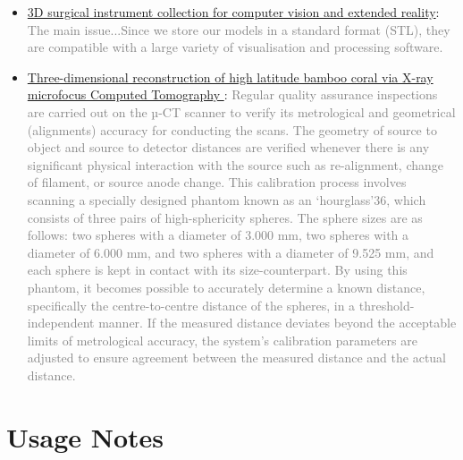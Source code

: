 \documentclass[fleqn,10pt]{wlscirep}
\begin{document}
\begin{itemize}
\begin{itemize}
\begin{itemize}
      \item
      \href{https://www.nature.com/articles/s41597-023-02684-0?_gl=1*1t69zgo*_up*MQ..&gclid=EAIaIQobChMInOXO84DVhgMViewWBR3vWQJAEAAYASAAEgJICfD_BwE#Sec12}{3D surgical instrument collection for computer vision and extended reality}: \textcolor{gray}{The main issue...Since we store our models in a standard format (STL), they are compatible with a large variety of visualisation and processing software.}
      
      \item
      \href{https://www.nature.com/articles/s41597-024-03396-9?_gl=1*1ikco52*_up*MQ..&gclid=EAIaIQobChMInOXO84DVhgMViewWBR3vWQJAEAAYASAAEgJICfD_BwE#Sec4}{Three-dimensional reconstruction of high latitude bamboo coral via X-ray microfocus Computed Tomography
}: \textcolor{gray}{Regular quality assurance inspections are carried out on the µ-CT scanner to verify its metrological and geometrical (alignments) accuracy for conducting the scans. The geometry of source to object and source to detector distances are verified whenever there is any significant physical interaction with the source such as re-alignment, change of filament, or source anode change. This calibration process involves scanning a specially designed phantom known as an ‘hourglass’36, which consists of three pairs of high-sphericity spheres. The sphere sizes are as follows: two spheres with a diameter of 3.000 mm, two spheres with a diameter of 6.000 mm, and two spheres with a diameter of 9.525 mm, and each sphere is kept in contact with its size-counterpart. By using this phantom, it becomes possible to accurately determine a known distance, specifically the centre-to-centre distance of the spheres, in a threshold-independent manner. If the measured distance deviates beyond the acceptable limits of metrological accuracy, the system’s calibration parameters are adjusted to ensure agreement between the measured distance and the actual distance.}
      
      \end{itemize}
      
    \end{itemize}
  
\end{itemize}

\section*{Usage Notes}
\end{document}
